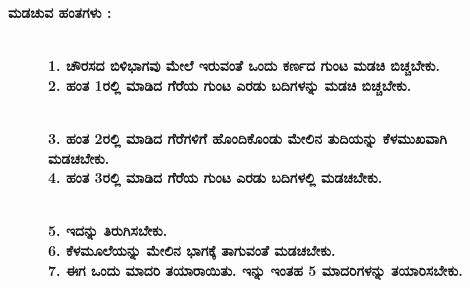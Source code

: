 \noindent
\textbf{ಮಡಚುವ ಹಂತಗಳು :}
\begin{figure}[H]
\\
\textbf{1. ಚೌರಸದ ಬಿಳಿಭಾಗವು ಮೇಲೆ ಇರುವಂತೆ ಒಂದು ಕರ್ಣದ ಗುಂಟ ಮಡಚಿ ಬಿಚ್ಚಬೇಕು.}\\
\textbf{2. ಹಂತ 1ರಲ್ಲಿ ಮಾಡಿದ ಗೆರೆಯ ಗುಂಟ ಎರಡು ಬದಿಗಳನ್ನು ಮಡಚಿ ಬಿಚ್ಚಬೇಕು.}
\end{figure}
\begin{figure}[H]
\\
\textbf{3. ಹಂತ 2ರಲ್ಲಿ ಮಾಡಿದ ಗೆರೆಗಳಿಗೆ ಹೊಂದಿಕೊಂಡು ಮೇಲಿನ ತುದಿಯನ್ನು ಕೆಳಮುಖವಾಗಿ ಮಡಚಬೇಕು.}\\
\textbf{4. ಹಂತ 3ರಲ್ಲಿ ಮಾಡಿದ ಗೆರೆಯ ಗುಂಟ ಎರಡು ಬದಿಗಳಲ್ಲಿ ಮಡಚಬೇಕು.}
\end{figure}
\begin{figure}[H]
\\
\textbf{5. ಇದನ್ನು ತಿರುಗಿಸಬೇಕು.}\\
\textbf{6. ಕೆಳಮೂಲೆಯನ್ನು ಮೇಲಿನ ಭಾಗಕ್ಕೆ ತಾಗುವಂತೆ ಮಡಚಬೇಕು.}\\
\textbf{7. ಈಗ ಒಂದು ಮಾದರಿ ತಯಾರಾಯಿತು. ಇನ್ನು ಇಂತಹ 5 ಮಾದರಿಗಳನ್ನು ತಯಾರಿಸಬೇಕು.}
\end{figure}
